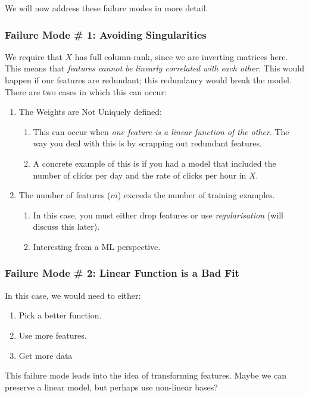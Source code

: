 \documentclass[11pt]{scrartcl}
\theoremstyle{definition}
\theoremstyle{remark}
\begin{document}
We will now address these failure modes in more detail. 

\subsubsection{Failure Mode \# 1: Avoiding Singularities}
We require that $X$ has full column-rank, since we are inverting matrices here. This means that \emph{features cannot be linearly correlated with each other}. This would happen if our features are redundant; this redundancy would break the model. There are two cases in which this can occur: 
\begin{enumerate}[noitemsep]
	\item The Weights are Not Uniquely defined: 
	\begin{enumerate}[noitemsep]
		\item This can occur when \emph{one feature is a linear function of the other}. The way you deal with this is by scrapping out redundant features. 
		\item A concrete example of this is if you had a model that included the number of clicks per day and the rate of clicks per hour in $X$. 
	\end{enumerate}
	\item The number of features ($m$) exceeds the number of training examples. 
	\begin{enumerate}[noitemsep]
		\item In this case, you must either drop features or use \emph{regularisation} (will discuss this later). 
		\item Interesting from a ML perspective. 
	\end{enumerate}
\end{enumerate}

\subsubsection{Failure Mode \# 2: Linear Function is a Bad Fit}
In this case, we would need to either: 
\begin{enumerate}[noitemsep]
	\item Pick a better function. 
	\item Use more features. 
	\item Get more data
\end{enumerate}
This failure mode leads into the idea of transforming features. Maybe we can preserve a linear model, but perhaps use non-linear bases? 
\end{document}
